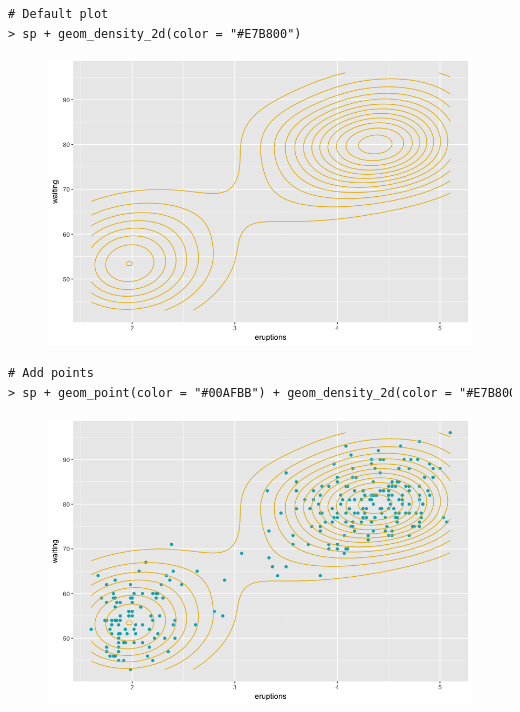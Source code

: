 \begin{lstlisting}[language=html]
# Default plot
> sp + geom_density_2d(color = "#E7B800")
\end{lstlisting}
\begin{figure}[H]\begin{center}\includegraphics[scale=1 ]{ilu/bg65.png}\end{center}\end{figure}
\begin{lstlisting}[language=html]
# Add points
> sp + geom_point(color = "#00AFBB") + geom_density_2d(color = "#E7B800")
\end{lstlisting}
\begin{figure}[H]\begin{center}\includegraphics[scale=1 ]{ilu/bg66.png}\end{center}\end{figure}
